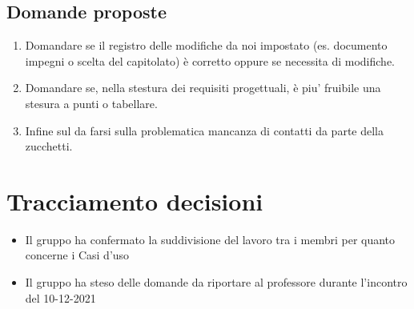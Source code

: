 \subsection{Domande proposte}
\begin{enumerate}
	\item Domandare se il registro delle modifiche da noi impostato (es. documento impegni o scelta del capitolato) è corretto oppure se necessita di modifiche.
	\item Domandare se, nella stestura dei requisiti progettuali, è piu' fruibile una stesura a punti o tabellare.
	\item Infine sul da farsi sulla problematica mancanza di contatti da parte della zucchetti.
\end{enumerate}

\section{Tracciamento decisioni}
\begin{itemize}
	\item Il gruppo ha confermato la suddivisione del lavoro tra i membri per quanto concerne i Casi d'uso
	\item Il gruppo ha steso delle domande da riportare al professore durante l'incontro del 10-12-2021
\end{itemize}